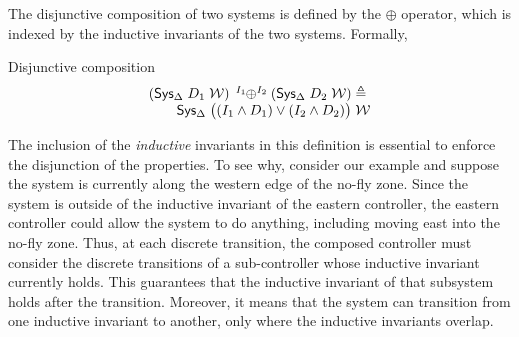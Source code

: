 The disjunctive composition of two systems is defined by the $\oplus$
operator, which is indexed by the inductive invariants of the two systems.
Formally,
\begin{definition}{Disjunctive composition}
\[\begin{array}{l}
\SysDisjoin{\left(\Sys{D_1}{\W}{\Delta}\right)}{I_1}{\left(\Sys{D_2}{\W}{\Delta}\right)}{I_2} \triangleq \\
\qquad \Sys{\big((I_1 \wedge D_1) \vee (I_2 \wedge D_2)\big)}{\W}{\Delta} %
\end{array}
\]
\end{definition}
The inclusion of the \emph{inductive} invariants in this definition is
essential to enforce the disjunction of the properties.  To see why,
consider our example and suppose the system is currently along the western
edge of the no-fly zone.  Since the system is outside of the inductive
invariant of the eastern controller, the eastern controller could allow the
system to do anything, including moving east into the no-fly zone.  Thus,
at each discrete transition, the composed controller must consider the
discrete transitions of a sub-controller whose inductive invariant
currently holds.  This guarantees that the inductive invariant of that
subsystem holds after the transition.  Moreover, it means that the system
can transition from one inductive invariant to another, only where the
inductive invariants overlap.

